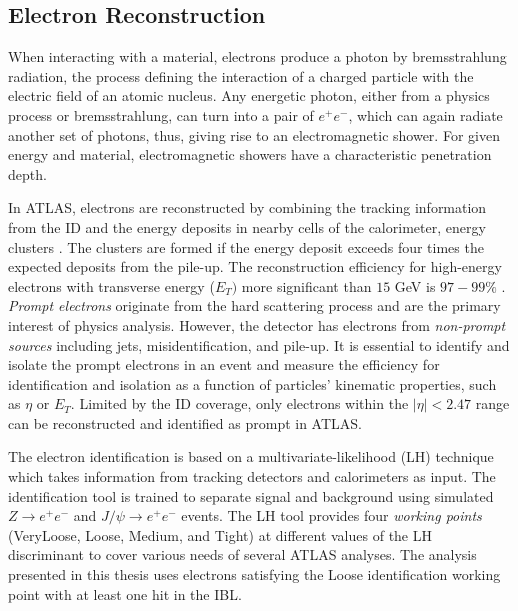 \subsection{Electron Reconstruction}
\label{subsec:ParticleRecon_Elec}
When interacting with a material, electrons produce a photon by bremsstrahlung radiation, the process defining the interaction of a charged particle with the electric field of an atomic nucleus. Any energetic photon, either from a physics process or bremsstrahlung, can turn into a pair of $e^{+}e^{-}$, which can again radiate another set of photons, thus, giving rise to an electromagnetic shower. For given energy and material, electromagnetic showers have a characteristic penetration depth.

In ATLAS, electrons are reconstructed by combining the tracking information from the ID and the energy deposits in nearby cells of the calorimeter,  energy clusters \cite{ElectronReco}. The clusters are formed if the energy deposit exceeds four times the expected deposits from the pile-up. The reconstruction efficiency for high-energy electrons with transverse energy ($E_{T})$ more significant than $15$ GeV is $97-99\%$ \cite{ElectronReco}. \textit{Prompt electrons} originate from the hard scattering process and are the primary interest of physics analysis. However, the detector has electrons from \textit{non-prompt sources} including jets, misidentification, and pile-up. It is essential to identify and isolate the prompt electrons in an event and measure the efficiency for identification and isolation as a function of particles' kinematic properties, such as $\eta$ or $E_{T}$. Limited by the ID coverage, only electrons within the $|\eta| <2.47$ range can be reconstructed and identified as prompt in ATLAS.

The electron identification is based on a multivariate-likelihood (LH) technique which takes information from tracking detectors and calorimeters as input. The identification tool is trained to separate signal and background using simulated $Z \rightarrow e^{+}e^{-}$ and $J / \psi \rightarrow e^{+}e^{-}$ events. The LH tool provides four \textit{working points} (VeryLoose, Loose, Medium, and Tight) at different values of the LH discriminant to cover various needs of several ATLAS analyses. The analysis presented in this thesis uses electrons satisfying the Loose identification working point with at least one hit in the IBL. 

